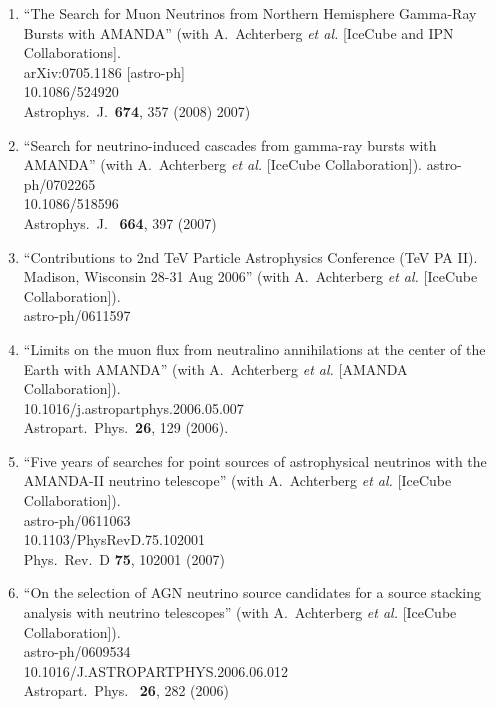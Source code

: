 \begin{enumerate}
\item ``The Search for Muon Neutrinos from Northern Hemisphere Gamma-Ray
  Bursts with AMANDA'' (with A.~Achterberg {\it et al.}  [IceCube and
    IPN Collaborations].  \\{}arXiv:0705.1186 [astro-ph]
  \\{}10.1086/524920 \\{}Astrophys.\ J.\ {\bf 674}, 357 (2008) %
  2007)


\item ``Search for neutrino-induced cascades from gamma-ray bursts with
  AMANDA'' (with A.~Achterberg {\it et al.}  [IceCube Collaboration]). astro-ph/0702265 \\{}10.1086/518596 \\{}Astrophys.\ J.\ {\bf
    664}, 397 (2007) %


\item ``Contributions to 2nd TeV Particle Astrophysics Conference (TeV PA
  II). Madison, Wisconsin 28-31 Aug 2006'' (with A.~Achterberg {\it et
    al.}  [IceCube Collaboration]).  \\{}astro-ph/0611597
  \\{}%


\item ``Limits on the muon flux from neutralino annihilations at the center
  of the Earth with AMANDA'' (with A.~Achterberg {\it et al.}  [AMANDA
    Collaboration]).  \\{}10.1016/j.astropartphys.2006.05.007
  \\{}Astropart.\ Phys.\ {\bf 26}, 129 (2006). %


\item ``Five years of searches for point sources of astrophysical neutrinos
  with the AMANDA-II neutrino telescope'' (with A.~Achterberg {\it et
    al.}  [IceCube Collaboration]).  \\{}astro-ph/0611063
  \\{}10.1103/PhysRevD.75.102001 \\{}Phys.\ Rev.\ D {\bf 75}, 102001
  (2007) %


\item ``On the selection of AGN neutrino source candidates for a source
  stacking analysis with neutrino telescopes'' (with A.~Achterberg {\it
    et al.}  [IceCube Collaboration]).  \\{}astro-ph/0609534
  \\{}10.1016/J.ASTROPARTPHYS.2006.06.012 \\{}Astropart.\ Phys.\ {\bf
    26}, 282 (2006) %



\end{enumerate}
